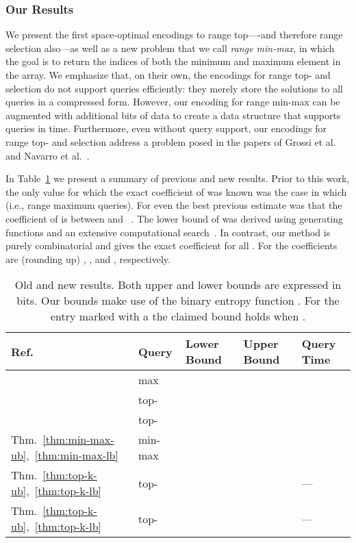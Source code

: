 \documentclass[runningheads]{llncs}
\begin{document}
\subsubsection{Our Results}

We present the first space-optimal encodings to range top----and
therefore range selection also---as well as a new problem that we call
\emph{range min-max}, in which the goal is to return the indices of
both the minimum and maximum element in the array.  We emphasize that,
on their own, the encodings for range top- and selection do not
support queries efficiently: they merely store the solutions to all
queries in a compressed form.  However, our encoding for range min-max
can be augmented with  additional bits of data to create a data
structure that supports queries in  time.  Furthermore, even
without query support, our encodings for range top- and selection
address a problem posed in the papers of Grossi et al.~ \cite{GINRS13}
and Navarro et al.~\cite{NRS14}.

In Table~\ref{tab:results} we present a summary of previous and new
results.  Prior to this work, the only value for which the exact
coefficient of  was known was the case in which  (i.e., range
maximum queries).  For even  the best previous estimate was that
the coefficient of  is between  and
~\cite{PNRR14}. The lower bound of  was derived using
generating functions and an extensive computational
search~\cite{PNRR14}.  In contrast, our method is purely combinatorial
and gives the exact coefficient for all .  For  the
coefficients are (rounding up) , , and ,
respectively.


\begin{table}[!t]
\centering
\caption{\label{tab:results} Old and new results. Both upper and lower
  bounds are expressed in bits.  Our bounds make use of the binary
  entropy function .  For the entry marked with a  the
  claimed bound holds when .}
\begin{tabular}{|l|l|l|l|l|}
\hline
Ref. & Query & Lower Bound & Upper Bound & Query Time \\
\hline
\cite{FH11}   & max     &  &  &  \\ 
\cite{GINRS13,NRS14}     & top- &  &  &  \\ 
\cite{PNRR14}     & top- &  &  &  \\
\hline
Thm.~\ref{thm:min-max-ub},~\ref{thm:min-max-lb}     & min-max &  &  &  \\ 
Thm.~\ref{thm:top-k-ub},~\ref{thm:top-k-lb}     & top- &  &   & --- \\ 
Thm.~\ref{thm:top-k-ub},~\ref{thm:top-k-lb}     & top- &   &  & --- \\
\hline
\end{tabular}
\end{table}
\end{document}
